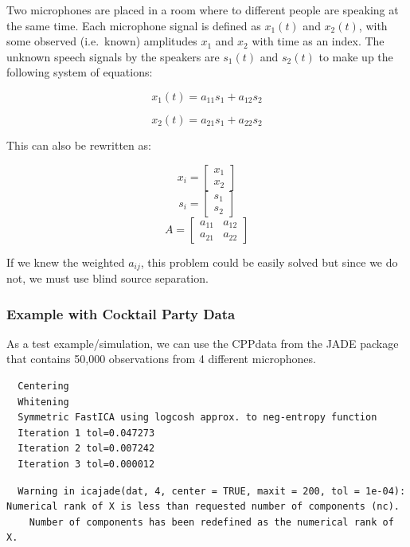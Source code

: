 \documentclass[12pt,twoside]{amherstthesis}
\begin{document}
  Two microphones are placed in a room where to different people are
  speaking at the same time. Each microphone signal is defined as
  \(x_1(t)\) and \(x_2(t)\), with some observed (i.e.~known) amplitudes
  \(x_1\) and \(x_2\) with time as an index. The unknown speech signals by
  the speakers are \(s_1(t)\) and \(s_2(t)\) to make up the following
  system of equations:
  
  \[ x_1(t) = a_{11}s_1 +a_{12}s_2 \]
  
  \[ x_2(t) = a_{21}s_1 +a_{22}s_2 \]
  
  This can also be rewritten as:
  
  \[x_i = \begin{bmatrix} x_1 \\ x_2 \end{bmatrix}\]
  \[s_i = \begin{bmatrix} s_1 \\ s_2 \end{bmatrix}\]
  \[A = \begin{bmatrix} a_{11} & a_{12} \\ a_{21} & a_{22}  \end{bmatrix}\]
  
  If we knew the weighted \(a_{ij}\), this problem could be easily solved
  but since we do not, we must use blind source separation.
  
  \subsubsection{Example with Cocktail Party
  Data}\label{example-with-cocktail-party-data}
  
  As a test example/simulation, we can use the CPPdata from the JADE
  package that contains 50,000 observations from 4 different microphones.
  
  \begin{verbatim}
  Centering
  Whitening
  Symmetric FastICA using logcosh approx. to neg-entropy function
  Iteration 1 tol=0.047273
  Iteration 2 tol=0.007242
  Iteration 3 tol=0.000012
  \end{verbatim}
  
  \begin{verbatim}
  Warning in icajade(dat, 4, center = TRUE, maxit = 200, tol = 1e-04): Numerical rank of X is less than requested number of components (nc).
    Number of components has been redefined as the numerical rank of X.
  \end{verbatim}
  
\end{document}
